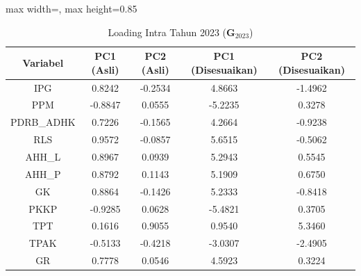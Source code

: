 \begin{table}[H]
\centering
\caption{Loading Intra Tahun 2023 ($\mathbf{G}_{2023}$)} \label{tab:apploading_intra_2023}
\begin{adjustbox}{max width=\textwidth, max height=0.85\textheight}
\begin{tabular}{|c|c|c|c|c|}
\hline
\textbf{Variabel} & \textbf{PC1 (Asli)} & \textbf{PC2 (Asli)} & \textbf{PC1 (Disesuaikan)} & \textbf{PC2 (Disesuaikan)} \\
\hline
IPG & 0.8242 & -0.2534 & 4.8663 & -1.4962 \\
PPM & -0.8847 & 0.0555 & -5.2235 & 0.3278 \\
PDRB\_ADHK & 0.7226 & -0.1565 & 4.2664 & -0.9238 \\
RLS & 0.9572 & -0.0857 & 5.6515 & -0.5062 \\
AHH\_L & 0.8967 & 0.0939 & 5.2943 & 0.5545 \\
AHH\_P & 0.8792 & 0.1143 & 5.1909 & 0.6750 \\
GK & 0.8864 & -0.1426 & 5.2333 & -0.8418 \\
PKKP & -0.9285 & 0.0628 & -5.4821 & 0.3705 \\
TPT & 0.1616 & 0.9055 & 0.9540 & 5.3460 \\
TPAK & -0.5133 & -0.4218 & -3.0307 & -2.4905 \\
GR & 0.7778 & 0.0546 & 4.5923 & 0.3224 \\
\hline
\end{tabular}
\end{adjustbox}
\end{table}